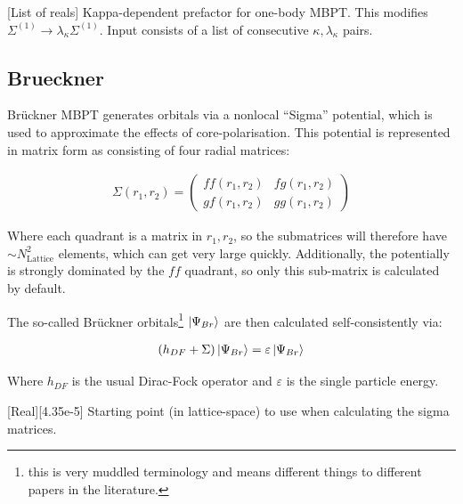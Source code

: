 \documentclass{report}
\begin{document}
[List of reals]{%
Kappa-dependent prefactor for one-body MBPT. This modifies $\Sigma^{(1)} \to \lambda_{\kappa}
\Sigma^{(1)}$. Input consists of a list of consecutive $\kappa, \lambda_{\kappa}$ pairs.%
}



\subsection{Brueckner}
\label{subsec:brueckner}

Br\"{u}ckner MBPT generates orbitals via a nonlocal ``Sigma'' potential, which is used to approximate
the effects of core-polarisation. This potential is represented in matrix 
form as consisting of four radial matrices:

\begin{align}
\Sigma(r_1, r_2) = 
\begin{pmatrix}
ff(r_1, r_2)    & fg(r_1, r_2)\\
gf(r_1, r_2)    & gg(r_1, r_2)
\end{pmatrix}
\end{align}

Where each quadrant is a matrix in $r_1, r_2$, so the submatrices will therefore have $\sim
N_{\mathrm{Lattice}}^2$ elements, which can get very large quickly. Additionally, the potentially is
strongly dominated by the $ff$ quadrant, so only this sub-matrix is calculated by default.

The so-called Br\"{u}ckner orbitals\footnote{this is very muddled terminology and 
means different things to different papers in the literature. } $\ket{\Psi_{Br}}$ are then calculated 
self-consistently via:

\begin{align}
\label{eq:brueckner}
(h_{DF} + \Sigma) \ket{\Psi_{Br}} = \varepsilon \ket{\Psi_{Br}}
\end{align}

Where $h_{DF}$ is the usual Dirac-Fock operator and $\varepsilon$ is the single particle energy.

[Real][4.35e-5]{%
Starting point (in lattice-space) to use when calculating the sigma matrices.%
}
\end{document}
